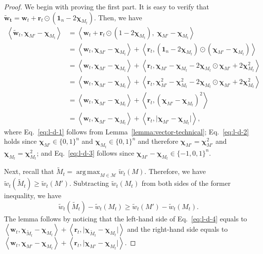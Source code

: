 \documentclass{article}
\newcommand{\M}{\mathcal M}
\DeclareMathOperator*{\argmax}{arg\,max}
\newcommand{\inn}[1]{\left\langle #1 \right\rangle}
\renewcommand{\vec}[1]{\boldsymbol{#1}}
\begin{document}
\begin{spacing}{1.1}
\begin{proof}
We begin with proving the first part.
It is easy to verify that $\vec {\tilde w_t} = \vec w_t+ \vec r_t \odot (\vec 1_n-2\vec\chi_{M_t})$.
Then, we have
\begin{align}
\inn{\vec{\tilde w}_t, \vec \chi_{M'}-\vec \chi_{M_t}}
&= \inn{\vec w_t+ \vec r_t \odot (1-2\vec\chi_{M_t}), \;\vec \chi_{M'}-\vec \chi_{M_t}} \nonumber \\
&= \inn{\vec w_t,\vec \chi_{M'}-\vec \chi_{M_t}}+\inn{\vec r_t, (\vec 1_n-2\vec\chi_{M_t}) \odot (\vec \chi_{M'}-\vec \chi_{M_t})}
\label{eq:l-d-1}\\
&= \inn{\vec w_t,\vec \chi_{M'}-\vec \chi_{M_t}}+\inn{\vec r_t, \vec\chi_{M'}-\vec\chi_{M_t}-2\vec\chi_{M_t}\odot\vec\chi_{M'}+2\vec\chi_{M_t}^2 } \nonumber\\
&= \inn{\vec w_t,\vec \chi_{M'}-\vec \chi_{M_t}}+\inn{\vec r_t, \vec\chi_{M'}^2-\vec\chi_{M_t}^2-2\vec\chi_{M_t}\odot\vec\chi_{M'}+2\vec\chi_{M_t}^2 }
\label{eq:l-d-2}\\
&= \inn{\vec w_t,\vec \chi_{M'}-\vec \chi_{M_t}}+\inn{\vec r_t, (\vec\chi_{M'}-\vec\chi_{M_t})^2}
\nonumber \\ \
&= \inn{\vec w_t,\vec \chi_{M'}-\vec \chi_{M_t}}+\inn{\vec r_t, \big|\vec\chi_{M'}-\vec\chi_{M_t}\big|},
\label{eq:l-d-3}
\end{align}
where
Eq.~\eqref{eq:l-d-1} follows from Lemma~\ref{lemma:vector-technical};
Eq.~\eqref{eq:l-d-2} holds since $\vec \chi_{M'}\in \{0,1\}^n$ and $\vec \chi_{M_t}\in \{0,1\}^n$
and therefore $\vec\chi_{M'}=\vec\chi_{M'}^2$ and $\vec\chi_{M_t}=\vec\chi_{M_t}^2$;
and Eq.~\eqref{eq:l-d-3} follows since $\vec\chi_{M'}-\vec\chi_{M_t}\in \{-1,0,1\}^n$.

Next, recall that $\tilde M_t = \argmax_{M\in \M} \tilde w_t(M)$.
Therefore, we have $\tilde w_t(\tilde M_t) \ge \tilde w_t(M')$.
Subtracting $\tilde w_t(M_t)$ from both sides of the former inequality, we have
\begin{equation}
\tilde w_t(\tilde M_t)-\tilde w_t(M_t) \ge \tilde w_t(M')-\tilde w_t(M_t).
\label{eq:l-d-4}
\end{equation}
The lemma follows by noticing that the left-hand side of Eq.~\eqref{eq:l-d-4} equals to 
$\inn{\vec w_t,\vec \chi_{\tilde M_t}-\vec \chi_{M_t}}+\inn{\vec r_t, \big|\vec\chi_{\tilde M_t}-\vec\chi_{M_t}\big|}$
and the right-hand side equals to
$\inn{\vec w_t,\vec \chi_{M'}-\vec \chi_{M_t}}+\inn{\vec r_t, \big|\vec\chi_{M'}-\vec\chi_{M_t}\big|}$.
\end{proof}



\end{spacing}
\end{document}
